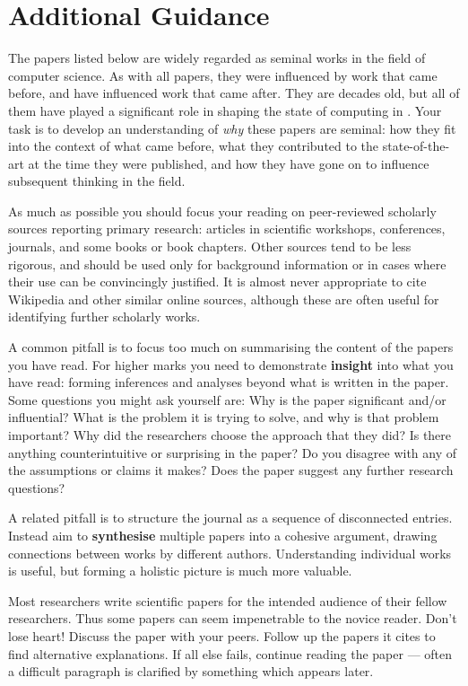 \documentclass{../../fal_assignment}
\begin{document}
\section*{Additional Guidance}

The papers listed below are widely regarded as seminal works in the field of computer science.
As with all papers, they were influenced by work that came before,
and have influenced work that came after.
They are decades old, but all of them have played a significant role in shaping the state of computing
in \the\year.
Your task is to develop an understanding of \textit{why} these papers are seminal:
how they fit into the context of what came before,
what they contributed to the state-of-the-art at the time they were published,
and how they have gone on to influence subsequent thinking in the field.

As much as possible you should focus your reading on peer-reviewed scholarly sources reporting primary research:
articles in scientific workshops, conferences, journals, and some books or book chapters.
Other sources tend to be less rigorous, and should be used only for background information
or in cases where their use can be convincingly justified.
It is almost never appropriate to cite Wikipedia and other similar online sources,
although these are often useful for identifying further scholarly works.

A common pitfall is to focus too much on summarising the content of the papers you have read.
For higher marks you need to demonstrate \textbf{insight} into what you have read:
forming inferences and analyses beyond what is written in the paper.
Some questions you might ask yourself are:
Why is the paper significant and/or influential?
What is the problem it is trying to solve, and why is that problem important?
Why did the researchers choose the approach that they did?
Is there anything counterintuitive or surprising in the paper?
Do you disagree with any of the assumptions or claims it makes?
Does the paper suggest any further research questions?

A related pitfall is to structure the journal as a sequence of disconnected entries.
Instead aim to \textbf{synthesise} multiple papers into a cohesive argument,
drawing connections between works by different authors.
Understanding individual works is useful, but forming a holistic picture is much more valuable.

Most researchers write scientific papers for the intended audience of their fellow researchers.
Thus some papers can seem impenetrable to the novice reader.
Don't lose heart!
Discuss the paper with your peers.
Follow up the papers it cites to find alternative explanations.
If all else fails, continue reading the paper --- often a difficult paragraph is clarified by something which appears later.
\end{document}
